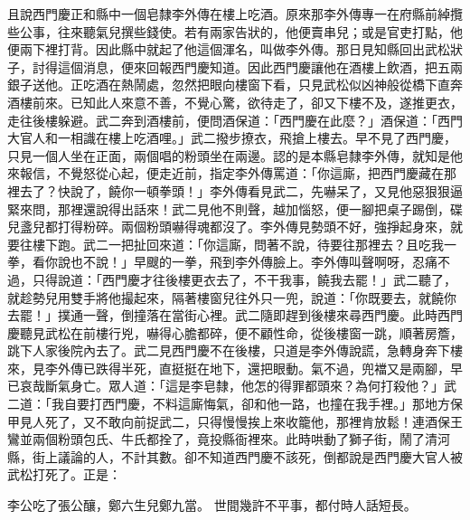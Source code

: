 \begin{showcontents}{}
且說西門慶正和縣中一個皂隸李外傳在樓上吃酒。原來那李外傳專一在府縣前綽攬些公事，往來聽氣兒撰些錢使。若有兩家告狀的，他便賣串兒；或是官吏打點，他便兩下裡打背。因此縣中就起了他這個渾名，叫做李外傳。那日見知縣回出武松狀子，討得這個消息，便來回報西門慶知道。因此西門慶讓他在酒樓上飲酒，把五兩銀子送他。正吃酒在熱鬧處，忽然把眼向樓窗下看，只見武松似凶神般從橋下直奔酒樓前來。已知此人來意不善，不覺心驚，欲待走了，卻又下樓不及，遂推更衣，走往後樓躲避。武二奔到酒樓前，便問酒保道：「西門慶在此麼？」酒保道：「西門大官人和一相識在樓上吃酒哩。」武二撥步撩衣，飛搶上樓去。早不見了西門慶，只見一個人坐在正面，兩個唱的粉頭坐在兩邊。認的是本縣皂隸李外傳，就知是他來報信，不覺怒從心起，便走近前，指定李外傳罵道：「你這廝，把西門慶藏在那裡去了？快說了，饒你一頓拳頭！」李外傳看見武二，先嚇呆了，又見他惡狠狠逼緊來問，那裡還說得出話來！武二見他不則聲，越加惱怒，便一腳把桌子踢倒，碟兒盞兒都打得粉碎。兩個粉頭嚇得魂都沒了。李外傳見勢頭不好，強掙起身來，就要往樓下跑。武二一把扯回來道：「你這廝，問著不說，待要往那裡去？且吃我一拳，看你說也不說！」早颼的一拳，飛到李外傳臉上。李外傳叫聲啊呀，忍痛不過，只得說道：「西門慶才往後樓更衣去了，不干我事，饒我去罷！」武二聽了，就趁勢兒用雙手將他撮起來，隔著樓窗兒往外只一兜，說道：「你既要去，就饒你去罷！」撲通一聲，倒撞落在當街心裡。武二隨即趕到後樓來尋西門慶。此時西門慶聽見武松在前樓行兇，嚇得心膽都碎，便不顧性命，從後樓窗一跳，順著房簷，跳下人家後院內去了。武二見西門慶不在後樓，只道是李外傳說謊，急轉身奔下樓來，見李外傳已跌得半死，直挺挺在地下，還把眼動。氣不過，兜襠又是兩腳，早已哀哉斷氣身亡。眾人道：「這是李皂隸，他怎的得罪都頭來？為何打殺他？」武二道：「我自要打西門慶，不料這廝悔氣，卻和他一路，也撞在我手裡。」那地方保甲見人死了，又不敢向前捉武二，只得慢慢挨上來收籠他，那裡肯放鬆！連酒保王鸞並兩個粉頭包氏、牛氏都拴了，竟投縣衙裡來。此時哄動了獅子街，鬧了清河縣，街上議論的人，不計其數。卻不知道西門慶不該死，倒都說是西門慶大官人被武松打死了。正是：

李公吃了張公釀，鄭六生兒鄭九當。
世間幾許不平事，都付時人話短長。






\end{showcontents}


